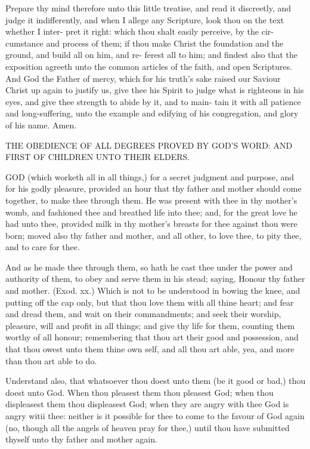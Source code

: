 \documentclass{custom}
\begin{document}
Prepare thy mind therefore unto this little treatise, and 
read it discreetly, and judge it indifferently, and when I
allege any Scripture, look thou on the text whether I inter- 
pret it right: which thou shalt easily perceive, by the cir-
cumstance and process of them; if thou make Christ the 
foundation and the ground, and build all on him, and re- 
ferest all to him; and findest also that the exposition 
agreeth unto the common articles of the faith, and open 
Scriptures. And God the Father of mercy, which for his 
truth's sake raised our Saviour Christ up again to justify 
us, give thee his Spirit to judge what is righteous in his 
eyes, and give thee strength to abide by it, and to main- 
tain it with all patience and long-suffering, unto the 
example and edifying of his congregation, and glory of his 
name. Amen. 


THE 
OBEDIENCE OF ALL DEGREES 
PROVED BY GOD'S WORD: AND FIRST OF CHILDREN 
UNTO THEIR ELDERS.

GOD (which worketh all in all things,) for a secret 
judgment and purpose, and for his godly pleasure, 
provided an hour that thy father and mother should come 
together, to make thee through them. He was present 
with thee in thy mother's womb, and fashioned thee 
and breathed life into thee; and, for the great love he had 
unto thee, provided milk in thy mother's breasts for thee 
against thou were born; moved also thy father and 
mother, and all other, to love thee, to pity thee, and to 
care for thee. 

And as he made thee through them, so hath he cast thee 
under the power and authority of them, to obey and serve 
them in his stead; saying, Honour thy father and mother. 
(Exod. xx.) Which is not to be understood in bowing 
the knee, and putting off the cap only, but that thou love 
them with all thine heart; and fear and dread them, and 
wait on their commandments; and seek their worship,
pleasure, will and profit in all things; and give thy life for 
them, counting them worthy of all honour; remembering 
that thou art their good and possession, and that thou 
owest unto them thine own self, and all thou art able, yea, 
and more than thou art able to do.

Understand also, that whatsoever thou doest unto them 
(be it good or bad,) thou doest unto God. When thou 
pleasest them thou pleasest God; when thou displeasest 
them thou displeasest God; when they are angry with 
thee God is angry witii thee: neither is it possible for 
thee to come to the favour of God again (no, though 
all the angels of heaven pray for thee,) until thou have 
submitted thyself unto thy father and mother again. 
\end{document}
